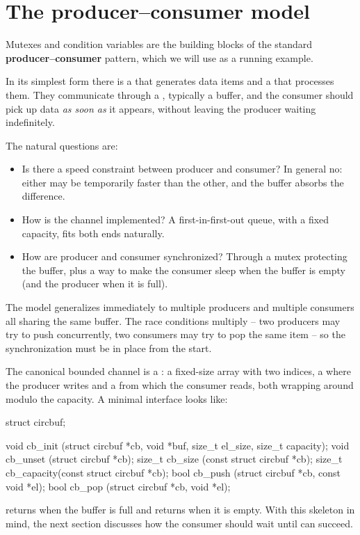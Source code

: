 \section{The producer--consumer model}

Mutexes and condition variables are the building blocks of the standard \textbf{producer--consumer} pattern, which we will use as a running example.

In its simplest form there is a  that generates data items and a  that processes them. They communicate through a , typically a buffer, and the consumer should pick up data \emph{as soon as} it appears, without leaving the producer waiting indefinitely.

The natural questions are:

\begin{itemize}[noitemsep]
    \item Is there a speed constraint between producer and consumer? In general no: either may be temporarily faster than the other, and the buffer absorbs the difference.
    \item How is the channel implemented? A first-in-first-out queue, with a fixed capacity, fits both ends naturally.
    \item How are producer and consumer synchronized? Through a mutex protecting the buffer, plus a way to make the consumer sleep when the buffer is empty (and the producer when it is full).
\end{itemize}

The model generalizes immediately to multiple producers and multiple consumers all sharing the same buffer. The race conditions multiply -- two producers may try to push concurrently, two consumers may try to pop the same item -- so the synchronization must be in place from the start.

\begin{exampleblock}
The canonical bounded channel is a : a fixed-size array with two indices, a  where the producer writes and a  from which the consumer reads, both wrapping around modulo the capacity. A minimal interface looks like:

\begin{codeblock}[language=C]
struct circbuf;

void   cb_init    (struct circbuf *cb, void *buf,
                   size_t el_size, size_t capacity);
void   cb_unset   (struct circbuf *cb);
size_t cb_size    (const struct circbuf *cb);
size_t cb_capacity(const struct circbuf *cb);
bool   cb_push    (struct circbuf *cb, const void *el);
bool   cb_pop     (struct circbuf *cb,       void *el);
\end{codeblock}

 returns  when the buffer is full and  returns  when it is empty. With this skeleton in mind, the next section discusses how the consumer should wait until  can succeed.
\end{exampleblock}

